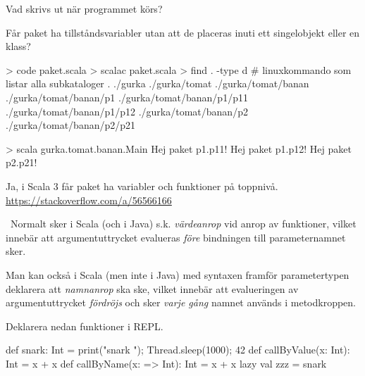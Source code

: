 \Subtask Vad skrivs ut när programmet körs?

\Subtask Får paket ha tillståndsvariabler utan att de placeras inuti ett singelobjekt eller en klass?

\SOLUTION

\TaskSolved \what

\SubtaskSolved

\begin{REPL}
> code paket.scala
> scalac paket.scala
> find . -type d         # linuxkommando som listar alla subkataloger
.
./gurka
./gurka/tomat
./gurka/tomat/banan
./gurka/tomat/banan/p1
./gurka/tomat/banan/p1/p11
./gurka/tomat/banan/p1/p12
./gurka/tomat/banan/p2
./gurka/tomat/banan/p2/p21
\end{REPL}

\SubtaskSolved
\begin{REPL}
> scala gurka.tomat.banan.Main
Hej paket p1.p11!
Hej paket p1.p12!
Hej paket p2.p21!
\end{REPL}

\SubtaskSolved Ja, i Scala 3 får paket ha variabler och funktioner på toppnivå. \\
 \url{https://stackoverflow.com/a/56566166}

\QUESTEND





\AdvancedTasks %








\QUESTBEGIN

\Task  \what~Normalt sker i Scala (och i Java) s.k. \emph{värdeanrop} vid anrop av funktioner, vilket innebär att argumentuttrycket evalueras \emph{före} bindningen till parameternamnet sker.

Man kan också i Scala (men inte i Java) med syntaxen \code{=>} framför parametertypen deklarera att \emph{namnanrop} ska ske, vilket innebär att evalueringen av argumentuttrycket \emph{fördröjs} och sker \emph{varje gång} namnet används i metodkroppen.

Deklarera nedan funktioner i REPL.

\begin{Code}
def snark: Int = { print("snark "); Thread.sleep(1000); 42 }
def callByValue(x: Int):   Int = x + x
def callByName(x: => Int): Int = x + x
lazy val zzz = snark
\end{Code}

